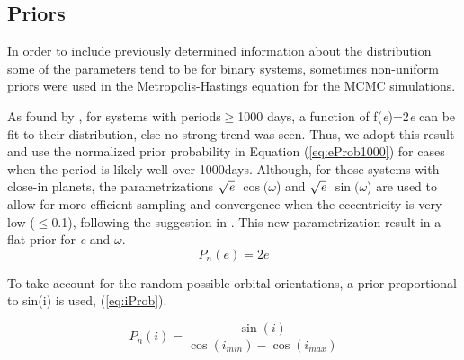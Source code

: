 \documentclass[12pt,preprint]{aastex}
\begin{document}


\pagebreak

\subsection{Priors}\label{sec:priors}

In order to include previously determined information about the distribution some of the parameters tend to be for binary systems, sometimes non-uniform priors were used in the Metropolis-Hastings equation for the MCMC simulations.

As found by \cite{duquennoy1991}, for systems with periods$\geq$1000 days, a function of f({\it e})=2{\it e} can be fit to their distribution, else no strong trend was seen.  Thus, we adopt this result and use the normalized prior probability in Equation (\ref{eq:eProb1000}) for cases when the period is likely well over 1000days.  Although, for those systems with close-in planets, the parametrizations $\sqrt{{\it e}}$ $\cos(\omega$) and $\sqrt{{\it e}}$ $\sin(\omega$) are used to allow for more efficient sampling and convergence when the eccentricity is very low ($\le$0.1), following the suggestion in \citet{albrecht2012}. This new parametrization result in a flat prior for {\it e} and $\omega$.
\begin{equation}\label{eq:eProb1000}
P_n(e) =  2e
\end{equation}

 
To take account for the random possible orbital orientations, a prior proportional to sin(i) is used, (\ref{eq:iProb}).

\begin{equation}\label{eq:iProb}
P_n(i) =  \frac{\sin(i)}{\cos(i_{min})-\cos(i_{max})}
\end{equation}
\end{document}
